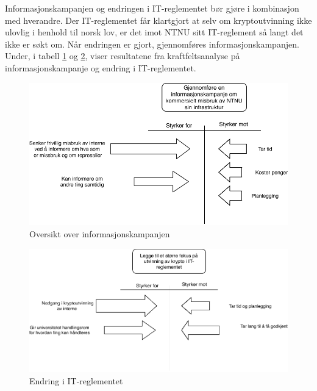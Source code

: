  Informasjonskampanjen og endringen i IT-reglementet bør gjøre i kombinasjon med hverandre. Der IT-reglementet får klartgjort at selv om kryptoutvinning ikke ulovlig i henhold til norsk lov, er det imot NTNU sitt IT-reglement så langt det ikke er søkt om. Når endringen er gjort, gjennomføres informasjonskampanjen.   
 Under, i tabell \ref{fig:kampanje} og \ref{fig:IT-reglement}, viser resultatene fra kraftfeltsanalyse på informasjonskampanje og endring i IT-reglementet.
 \begin{figure}[H]
    \hspace{2.2cm}
    \includegraphics[scale=0.6]{case_3/bilder/Force-field1.pdf}
    \caption[Informasjonskampanje]{Oversikt over informasjonskampanjen }
    \label{fig:kampanje}
\end{figure}

 
 \begin{figure}[H]
    \hspace{2.6cm}
    \includegraphics[scale=0.6]{case_3/bilder/Force-field2.pdf}
    \caption[Endre IT-reglementet]{Endring i IT-reglementet}
    \label{fig:IT-reglement}
\end{figure}

